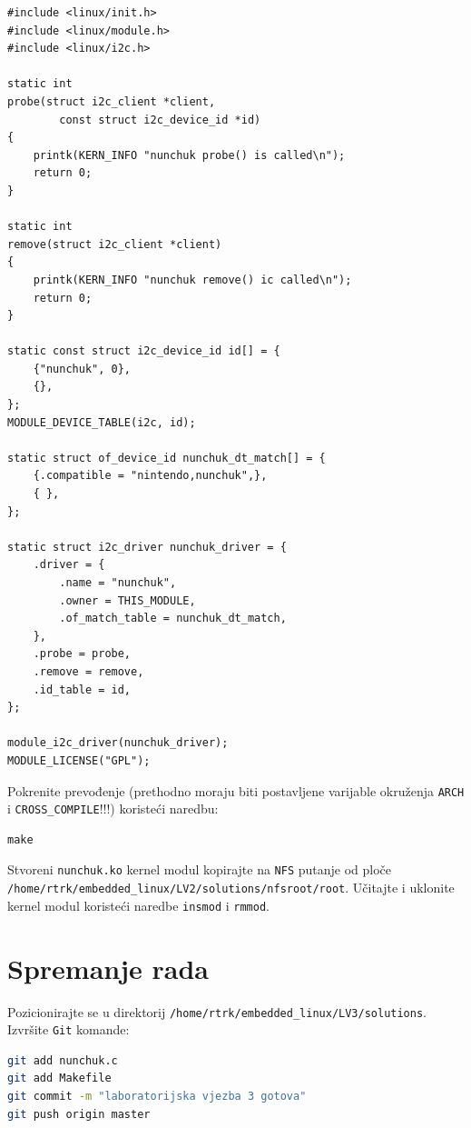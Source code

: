 \documentclass[11pt]{article}
\begin{document}
\begin{lstlisting}[style=CStyle]
#include <linux/init.h>
#include <linux/module.h>
#include <linux/i2c.h>

static int
probe(struct i2c_client *client,
		const struct i2c_device_id *id)
{
	printk(KERN_INFO "nunchuk probe() is called\n");
	return 0;
}

static int
remove(struct i2c_client *client)
{
	printk(KERN_INFO "nunchuk remove() ic called\n");
	return 0;
}

static const struct i2c_device_id id[] = {
	{"nunchuk", 0},
	{},
};
MODULE_DEVICE_TABLE(i2c, id);

static struct of_device_id nunchuk_dt_match[] = {
	{.compatible = "nintendo,nunchuk",},
	{ },
};

static struct i2c_driver nunchuk_driver = {
	.driver = {
		.name = "nunchuk",
		.owner = THIS_MODULE,
		.of_match_table = nunchuk_dt_match,
	},
	.probe = probe,
	.remove = remove,
	.id_table = id,
};

module_i2c_driver(nunchuk_driver);
MODULE_LICENSE("GPL");
\end{lstlisting}

Pokrenite prevođenje (prethodno moraju biti postavljene varijable okruženja
\texttt{ARCH} i \texttt{CROSS\_COMPILE}!!!) koristeći naredbu:
\begin{lstlisting}
make
\end{lstlisting}

\noindent Stvoreni \texttt{nunchuk.ko} kernel modul kopirajte na \texttt{NFS} putanje
od ploče \texttt{/home/rtrk/embedded\_linux/LV2/solutions/nfsroot/root}.
Učitajte i uklonite kernel modul koristeći naredbe \texttt{insmod} i \texttt{rmmod}.

\section{Spremanje rada}
Pozicionirajte se u direktorij \texttt{/home/rtrk/embedded\_linux/LV3/solutions}.
Izvršite \texttt{Git} komande:
\begin{lstlisting}[language=bash]
git add nunchuk.c
git add Makefile
git commit -m "laboratorijska vjezba 3 gotova"
git push origin master
\end{lstlisting}
\end{document}
